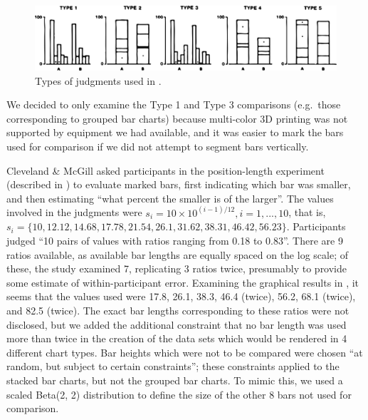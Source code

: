 \documentclass[runningheads
]{llncs}
\begin{document}
\begin{figure}

{\centering \includegraphics{image/CM1984Fig4.png}

}

\caption{\label{fig-cm-types}Types of judgments used in
\textcite{clevelandGraphicalPerceptionTheory1984}.}

\end{figure}

We decided to only examine the Type 1 and Type 3 comparisons (e.g.~those
corresponding to grouped bar charts) because multi-color 3D printing was
not supported by equipment we had available, and it was easier to mark
the bars used for comparison if we did not attempt to segment bars
vertically.

Cleveland \& McGill asked participants in the position-length experiment
(described in \autocite{clevelandGraphicalPerceptionTheory1984}) to
evaluate marked bars, first indicating which bar was smaller, and then
estimating ``what percent the smaller is of the larger''. The values
involved in the judgments were
\(s_i = 10 \times 10^{(i-1)/12}, i = 1, ..., 10\), that is,
\(s_i =\{10, 12.12, 14.68, 17.78, 21.54, 26.1, 31.62, 38.31, 46.42, 56.23\}\).
Participants judged ``10 pairs of values with ratios ranging from 0.18
to 0.83''. There are 9 ratios available, as available bar lengths are
equally spaced on the log scale; of these, the study examined 7,
replicating 3 ratios twice, presumably to provide some estimate of
within-participant error. Examining the graphical results in
\textcite{clevelandGraphicalPerceptionTheory1984}, it seems that the
values used were 17.8, 26.1, 38.3, 46.4 (twice), 56.2, 68.1 (twice), and
82.5 (twice). The exact bar lengths corresponding to these ratios were
not disclosed, but we added the additional constraint that no bar length
was used more than twice in the creation of the data sets which would be
rendered in 4 different chart types. Bar heights which were not to be
compared were chosen ``at random, but subject to certain constraints'';
these constraints applied to the stacked bar charts, but not the grouped
bar charts. To mimic this, we used a scaled Beta(2, 2) distribution to
define the size of the other 8 bars not used for comparison.
\end{document}
